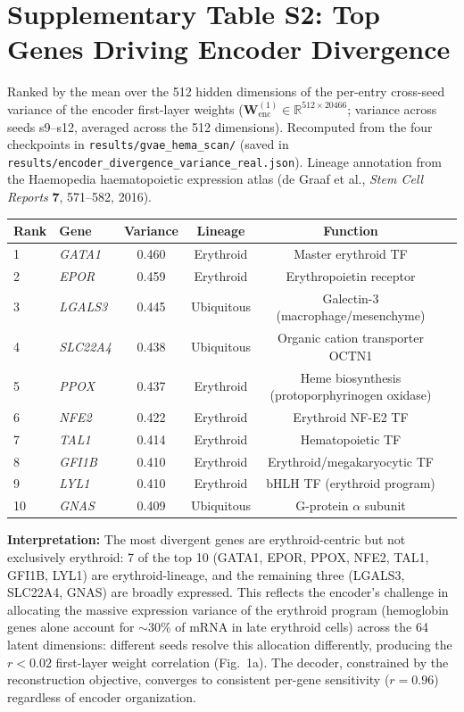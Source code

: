\documentclass[11pt,a4paper]{article}
\begin{document}
\section*{Supplementary Table S2: Top Genes Driving Encoder Divergence}
\label{tab:s2_divergent}

Ranked by the mean over the 512 hidden dimensions of the per-entry cross-seed variance of the encoder first-layer weights ($\mathbf{W}_{\text{enc}}^{(1)} \in \mathbb{R}^{512 \times 20466}$; variance across seeds s9--s12, averaged across the 512 dimensions). Recomputed from the four checkpoints in \texttt{results/gvae\_hema\_scan/} (saved in \texttt{results/encoder\_divergence\_variance\_real.json}). Lineage annotation from the Haemopedia haematopoietic expression atlas (de Graaf et al., \textit{Stem Cell Reports} \textbf{7}, 571--582, 2016).

\vspace{0.5cm}
\begin{tabular}{llcccl}
\toprule
\textbf{Rank} & \textbf{Gene} & \textbf{Variance} & \textbf{Lineage} & \textbf{Function} \\
\midrule
1  & \textit{GATA1}  & 0.460 & Erythroid  & Master erythroid TF \\
2  & \textit{EPOR}   & 0.459 & Erythroid  & Erythropoietin receptor \\
3  & \textit{LGALS3} & 0.445 & Ubiquitous & Galectin-3 (macrophage/mesenchyme) \\
4  & \textit{SLC22A4} & 0.438 & Ubiquitous & Organic cation transporter OCTN1 \\
5  & \textit{PPOX}   & 0.437 & Erythroid  & Heme biosynthesis (protoporphyrinogen oxidase) \\
6  & \textit{NFE2}   & 0.422 & Erythroid  & Erythroid NF-E2 TF \\
7  & \textit{TAL1}   & 0.414 & Erythroid  & Hematopoietic TF \\
8  & \textit{GFI1B}  & 0.410 & Erythroid  & Erythroid/megakaryocytic TF \\
9  & \textit{LYL1}   & 0.410 & Erythroid  & bHLH TF (erythroid program) \\
10 & \textit{GNAS}   & 0.409 & Ubiquitous & G-protein $\alpha$ subunit \\
\bottomrule
\end{tabular}

\vspace{0.5cm}
\textbf{Interpretation:} The most divergent genes are erythroid-centric but not exclusively erythroid: 7 of the top 10 (GATA1, EPOR, PPOX, NFE2, TAL1, GFI1B, LYL1) are erythroid-lineage, and the remaining three (LGALS3, SLC22A4, GNAS) are broadly expressed. This reflects the encoder's challenge in allocating the massive expression variance of the erythroid program (hemoglobin genes alone account for $\sim$30\% of mRNA in late erythroid cells) across the 64 latent dimensions: different seeds resolve this allocation differently, producing the $r<0.02$ first-layer weight correlation (Fig.~1a). The decoder, constrained by the reconstruction objective, converges to consistent per-gene sensitivity ($r=0.96$) regardless of encoder organization.
\end{document}

